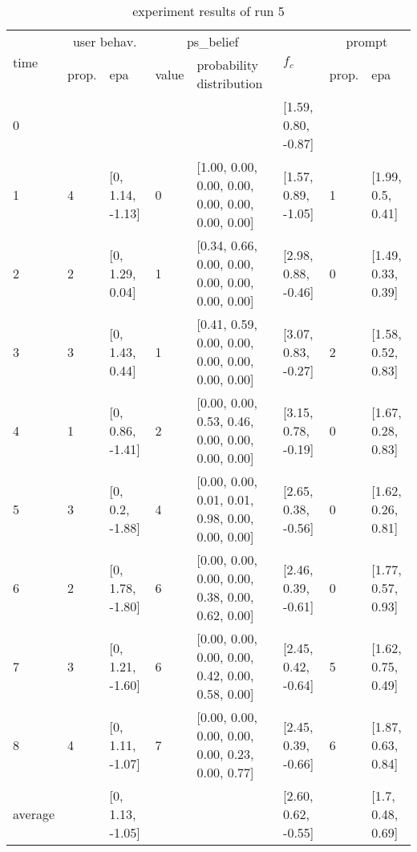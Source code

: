 \begin{table}[htbp]\footnotesize
\caption{experiment results of run 5}
\begin{tabular}{|p{0.4cm}|p{0.6cm}|l|p{0.6cm}|p{3.3cm}|l|p{0.6cm}|l|}
\hline

\multirow{2}{*}{time} & \multicolumn{2}{c|}{user behav.} & \multicolumn{2}{c|}{ps\_belief} &
\multirow{2}{*}{$f_c$} & \multicolumn{2}{c|}{prompt} \\ \cline{2-5}\cline{ 7- 8}
& prop. & epa & value & probability distribution &  & prop. & epa \\ \hline

0 & \multicolumn{1}{l|}{} &  & \multicolumn{1}{l|}{} &  & [1.59, 0.80, -0.87] & \multicolumn{1}{l|}{} &  \\ \hline
1 & 4 & [0, 1.14, -1.13] & 0 & [1.00, 0.00, 0.00, 0.00, 0.00, 0.00, 0.00, 0.00] & [1.57, 0.89, -1.05] & 1 & [1.99, 0.5, 0.41] \\ \hline
2 & 2 & [0, 1.29, 0.04] & 1 & [0.34, 0.66, 0.00, 0.00, 0.00, 0.00, 0.00, 0.00] & [2.98, 0.88, -0.46] & 0 & [1.49, 0.33, 0.39] \\ \hline
3 & 3 & [0, 1.43, 0.44] & 1 & [0.41, 0.59, 0.00, 0.00, 0.00, 0.00, 0.00, 0.00] & [3.07, 0.83, -0.27] & 2 & [1.58, 0.52, 0.83] \\ \hline
4 & 1 & [0, 0.86, -1.41] & 2 & [0.00, 0.00, 0.53, 0.46, 0.00, 0.00, 0.00, 0.00] & [3.15, 0.78, -0.19] & 0 & [1.67, 0.28, 0.83] \\ \hline
5 & 3 & [0, 0.2, -1.88] & 4 & [0.00, 0.00, 0.01, 0.01, 0.98, 0.00, 0.00, 0.00] & [2.65, 0.38, -0.56] & 0 & [1.62, 0.26, 0.81] \\ \hline
6 & 2 & [0, 1.78, -1.80] & 6 & [0.00, 0.00, 0.00, 0.00, 0.38, 0.00, 0.62, 0.00] & [2.46, 0.39, -0.61] & 0 & [1.77, 0.57, 0.93] \\ \hline
7 & 3 & [0, 1.21, -1.60] & 6 & [0.00, 0.00, 0.00, 0.00, 0.42, 0.00, 0.58, 0.00] & [2.45, 0.42, -0.64] & 5 & [1.62, 0.75, 0.49] \\ \hline
8 & 4 & [0, 1.11, -1.07] & 7 & [0.00, 0.00, 0.00, 0.00, 0.00, 0.23, 0.00, 0.77] & [2.45, 0.39, -0.66] & 6 & [1.87, 0.63, 0.84] \\ \hline
\multicolumn{1}{|l|}{average} & \multicolumn{1}{l|}{} & [0, 1.13, -1.05] & \multicolumn{1}{l|}{} &  & [2.60, 0.62, -0.55] & \multicolumn{1}{l|}{} & [1.7, 0.48, 0.69] \\ \hline
\end{tabular}
\label{}
\end{table}


